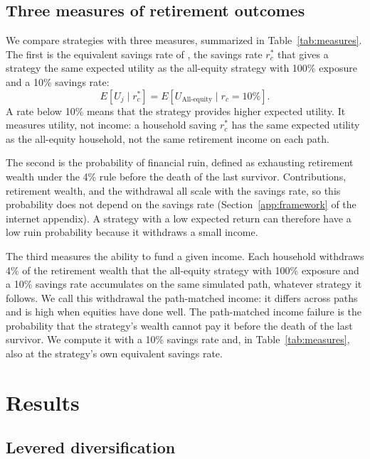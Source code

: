 \documentclass[12pt]{article}
\makeatletter
\newif\ifsubmission
\newcommand{\exhibitlist}{}
\newcommand{\exhibit}[1]{\ifsubmission\g@addto@macro\exhibitlist{}\else\fi}
\makeatother
\begin{document}
\subsection{Three measures of retirement outcomes}
\label{sec:outcomes}

We compare strategies with three measures, summarized in Table~\ref{tab:measures}. The first is the
equivalent savings rate of \citet{AnarkulovaCederburgODoherty2025}, the savings rate $r_c^*$ that gives a
strategy the same expected utility as the all-equity strategy with 100\% exposure and a 10\% savings rate:
\begin{equation}
 E[U_j\mid r_c^*]=E[U_{\text{All-equity}}\mid r_c=10\%].
 \label{eq:eqsaving}
\end{equation}
A rate below 10\% means that the strategy provides higher expected utility. It measures utility, not
income: a household saving $r_c^*$ has the same expected utility as the all-equity household, not the same
retirement income on each path.

The second is the probability of financial ruin, defined as exhausting retirement wealth under the 4\% rule
before the death of the last survivor. Contributions, retirement wealth, and the withdrawal all scale with
the savings rate, so this probability does not depend on the savings rate
(Section~\ref{app:framework} of the internet appendix). A strategy with a low expected return can
therefore have a low ruin probability because it withdraws a small income.

The third measures the ability to fund a given income. Each household withdraws 4\% of the retirement
wealth that the all-equity strategy with 100\% exposure and a 10\% savings rate accumulates on the same
simulated path, whatever strategy it follows. We call this withdrawal the path-matched income: it differs
across paths and is high when equities have done well. The path-matched income failure is the probability
that the strategy's wealth cannot pay it before the death of the last survivor. We compute it with a 10\%
savings rate and, in Table~\ref{tab:measures}, also at the strategy's own equivalent savings rate.
\exhibit{figures/erc/measures.tex}

\section{Results}
\label{sec:results}\label{sec:leverage-ladders-main}

\subsection{Levered diversification}
\label{sec:main}
\end{document}
